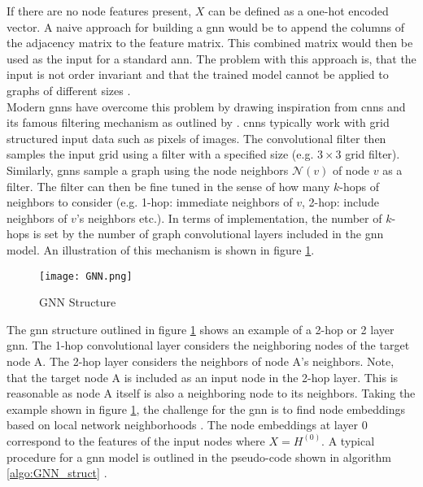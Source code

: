 	\noindent If there are no node features present, $X$ can be defined as a 
	one-hot encoded vector. A naive approach for building a \acs{gnn} would be to
	append the columns of the adjacency matrix to the feature matrix. This
	combined matrix would then be used as the input for a standard \acs{ann}. 
	The problem with this approach is, that the input is not order invariant and 
	that the trained model cannot be applied to graphs of different sizes 
	\citep{leskovec2021lecture}. \\

	\noindent Modern \acsp{gnn} have overcome this problem by drawing inspiration 
	from \acp{cnn} and its famous filtering mechanism as outlined by 
	\cite{krizhevsky2012imagenet}. \acsp{cnn} typically work with grid 
	structured input data such as pixels of images. The convolutional filter 
	then samples the input grid using a filter with a specified size 
	(e.g. $3\times3$ grid filter). Similarly, \acsp{gnn} sample a graph using 
	the node neighbors $\mathcal{N}(v)$ of node $v$ as a filter. The filter can 
	then be fine tuned in the sense of how many $k$-hops of neighbors to consider 
	(e.g. 1-hop: immediate neighbors of $v$, 2-hop: include neighbors of $v$'s 
	neighbors etc.). In terms of implementation, the number of $k$-hops is set 
	by the number of graph convolutional layers included in the \acs{gnn} model. 
	An illustration of this mechanism is shown in figure \ref{fig:GNN_structure}. \\

	\begin{figure}[h]
		\centering
		\texttt{[image: GNN.png]}
		\caption{GNN Structure}
		\citep{leskovec2021lecture}
		\label{fig:GNN_structure}
	\end{figure}

	\noindent The \acs{gnn} structure outlined in figure \ref{fig:GNN_structure} 
	shows an example of a 2-hop or 2 layer \acs{gnn}. The 1-hop convolutional layer 
	considers the neighboring nodes of the target node A. The 2-hop layer 
	considers the neighbors of node A's neighbors. Note, that the target node A 
	is included as an input node in the 2-hop layer. This is reasonable as node 
	A itself is also a neighboring node to its neighbors. Taking the example 
	shown in figure \ref{fig:GNN_structure}, the challenge for the \acs{gnn} is to 
	find node embeddings based on local network neighborhoods \citep{leskovec2021lecture}. 
	The node embeddings at layer 0 correspond to the features of the input nodes 
	where $X = H^{(0)}$. A typical procedure for a \acs{gnn} model is outlined 
	in the pseudo-code shown in algorithm \ref{algo:GNN_struct} 
	\citep{hamilton2017inductive,leskovec2021lecture,you2020design}.	

